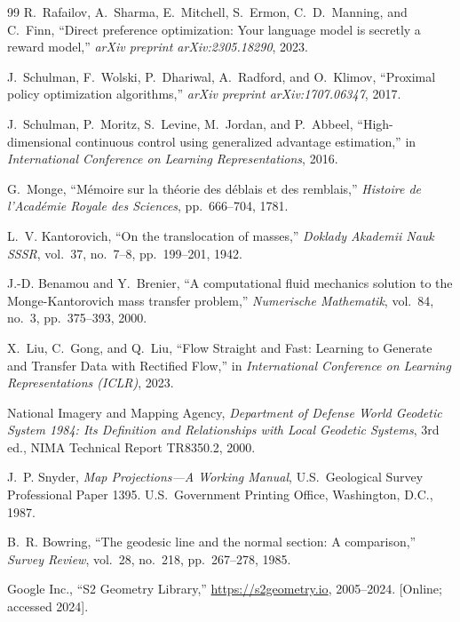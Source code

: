 \documentclass{book}
\begin{document}
\begin{thebibliography}{99}
R.~Rafailov, A.~Sharma, E.~Mitchell, S.~Ermon, C.~D.~Manning, and C.~Finn, ``Direct preference optimization: Your language model is secretly a reward model,'' \textit{arXiv preprint arXiv:2305.18290}, 2023.
 
J.~Schulman, F.~Wolski, P.~Dhariwal, A.~Radford, and O.~Klimov, ``Proximal policy optimization algorithms,'' \textit{arXiv preprint arXiv:1707.06347}, 2017.
 
J.~Schulman, P.~Moritz, S.~Levine, M.~Jordan, and P.~Abbeel, ``High-dimensional continuous control using generalized advantage estimation,'' in \textit{International Conference on Learning Representations}, 2016.
 
G.~Monge, ``M{\'e}moire sur la th{\'e}orie des d{\'e}blais et des remblais,'' \textit{Histoire de l'Acad{\'e}mie Royale des Sciences}, pp.~666--704, 1781.
 
L.~V. Kantorovich, ``On the translocation of masses,'' \textit{Doklady Akademii Nauk SSSR}, vol.~37, no.~7--8, pp.~199--201, 1942.
 
J.-D. Benamou and Y.~Brenier, ``A computational fluid mechanics solution to the Monge-Kantorovich mass transfer problem,'' \textit{Numerische Mathematik}, vol.~84, no.~3, pp.~375--393, 2000.
 
X.~Liu, C.~Gong, and Q.~Liu, ``Flow Straight and Fast: Learning to Generate and Transfer Data with Rectified Flow,'' in \textit{International Conference on Learning Representations (ICLR)}, 2023.
 
 
National Imagery and Mapping Agency, \textit{Department of Defense World Geodetic System 1984: Its Definition and Relationships with Local Geodetic Systems}, 3rd ed., NIMA Technical Report TR8350.2, 2000.
 
J.~P. Snyder, \textit{Map Projections---A Working Manual}, U.S.\ Geological Survey Professional Paper 1395. U.S.\ Government Printing Office, Washington, D.C., 1987.
 
B.~R. Bowring, ``The geodesic line and the normal section: A comparison,'' \textit{Survey Review}, vol.~28, no.~218, pp.~267--278, 1985.
 
Google Inc., ``S2 Geometry Library,'' \url{https://s2geometry.io}, 2005--2024. [Online; accessed 2024].
 

\end{thebibliography}
\end{document}
